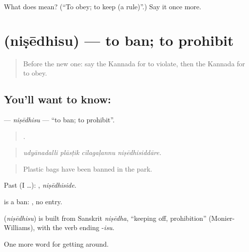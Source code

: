 \begin{tcolorbox}[breakable,colback=teal!4,colframe=teal!35!black,title={Before you move on}]
What does  mean? (\textquotedblleft{}To obey; to keep (a rule)\textquotedblright{}.) Say it once more.
\end{tcolorbox}
\section[\texorpdfstring{\kn{ನಿಷೇಧಿಸು} (niṣēdhisu)}{ನಿಷೇಧಿಸು (niṣēdhisu)}]{ (niṣēdhisu) — to ban; to prohibit}

\label{lesson:KA-C444-nisedhisu}



\begin{quote}
Before the new one: say the Kannada for to violate, then the Kannada for to obey.
\end{quote}

\subsection*{You'll want to know: }
\textbf{} — \emph{niṣēdhisu} — \textquotedblleft{}to ban; to prohibit\textquotedblright{}.

\begin{quote}
   .
\end{quote}

\begin{quote}
\emph{udyānadalli plāsṭik cīlagaḷannu niṣēdhisiddāre.}
\end{quote}

\begin{quote}
Plastic bags have been banned in the park.
\end{quote}

Past (I …): , \emph{niṣēdhiside}.

 is a ban:  , no entry.

\begin{cousinweb}
\textbf{} (\emph{niṣēdhisu}) is built from Sanskrit \emph{niṣēdha}, \textquotedblleft{}keeping off, prohibition\textquotedblright{} (Monier-Williams), with the verb ending -\emph{isu}.
\end{cousinweb}

\begin{grammarlens}[title={What you've built}]
One more word for getting around.
\end{grammarlens}

